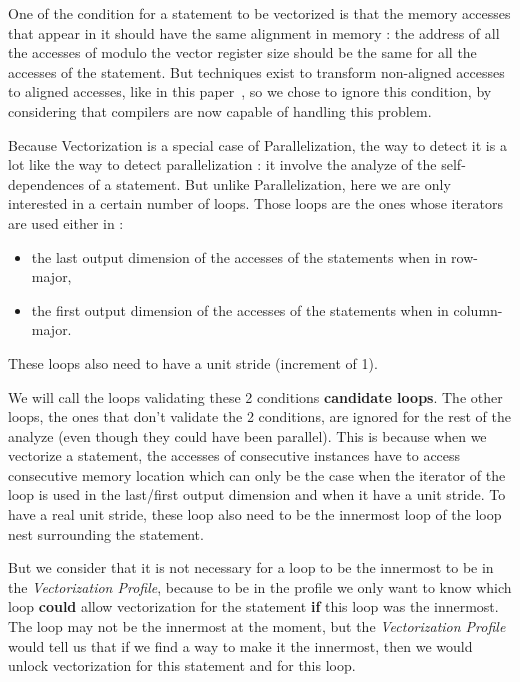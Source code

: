 \documentclass[paper=a4, fontsize=11pt]{scrartcl}
\numberwithin{equation}{section}        %
\numberwithin{figure}{section}          %
\numberwithin{table}{section}               %
\begin{document}
        One of the condition for a statement to be vectorized is that the memory accesses
        that appear in it should have the same alignment in memory : the address of all the
        accesses of modulo the vector register size should be the same for all the accesses
        of the statement.
        But techniques exist to transform non-aligned accesses to aligned accesses, like
        in this paper~\cite{Eichenberger:2004:VSA:996893.996853}, so we chose to ignore this
        condition, by considering that compilers are now capable of handling this problem.

        Because Vectorization is a special case of Parallelization, the way to detect it
        is a lot like the way to detect parallelization : it involve the analyze of
        the \glspl{self-dependence} of a statement. But unlike Parallelization, here we are
        only interested in a certain number of loops. Those loops are the ones whose iterators
        are used either in :
        \begin{itemize}
            \item the last output dimension of the accesses of the statements when in row-major,
            \item the first output dimension of the accesses of the statements when in column-major.
        \end{itemize}
        These loops also need to have a unit stride (increment of 1).

        We will call the loops validating these 2 conditions \textbf{candidate loops}.
        The other loops, the ones that don't validate the 2 conditions, are ignored for
        the rest of the analyze (even though they could have been parallel). This is
        because when we vectorize a statement, the accesses of consecutive instances have
        to access consecutive memory location which can only be the case when the iterator
        of the loop is used in the last/first output dimension and when it have a unit stride.
        To have a real unit stride, these loop also need to be the innermost loop of the loop nest
        surrounding the statement.
        
        But we consider that it is not necessary for a loop to be the innermost to be
        in the \textit{Vectorization Profile}, because to be in the profile
        we only want to know which loop \textbf{could} allow vectorization
        for the statement \textbf{if} this loop was the innermost. The loop may not be
        the innermost at the moment, but the \textit{Vectorization Profile} would tell
        us that if we find a way to make it the innermost, then we would unlock vectorization
        for this statement and for this loop.
\end{document}
